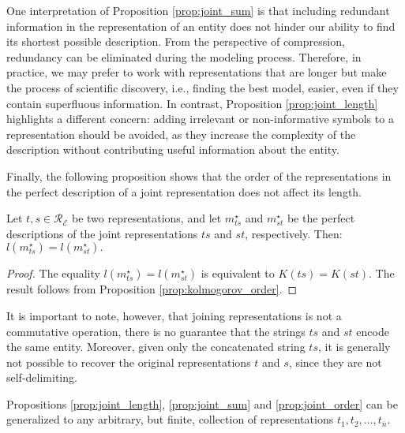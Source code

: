One interpretation of Proposition \ref{prop:joint_sum} is that including redundant information in the representation of an entity does not hinder our ability to find its shortest possible description. From the perspective of compression, redundancy can be eliminated during the modeling process. Therefore, in practice, we may prefer to work with representations that are longer but make the process of scientific discovery, i.e., finding the best model, easier, even if they contain superfluous information. In contrast, Proposition \ref{prop:joint_length} highlights a different concern: adding irrelevant or non-informative symbols to a representation should be avoided, as they increase the complexity of the description without contributing useful information about the entity.

Finally, the following proposition shows that the order of the representations in the perfect description of a joint representation does not affect its length.

\begin{proposition}
\label{prop:joint_order}
Let $t, s \in \mathcal{R}_\mathcal{E}$ be two representations, and let $m_{ts}^{\star}$ and $m_{st}^{\star}$ be the perfect descriptions of the joint representations $ts$ and $st$, respectively. Then: $l \left( m_{ts}^{\star} \right) = l \left( m_{st}^{\star} \right).$
\end{proposition}
\begin{proof}
The equality $l \left( m_{ts}^{\star} \right) = l \left( m_{st}^{\star} \right)$ is equivalent to $K(ts) = K(st)$. The result follows from Proposition \ref{prop:kolmogorov_order}.
\end{proof}

It is important to note, however, that joining representations is not a commutative operation, there is no guarantee that the strings $ts$ and $st$ encode the same entity. Moreover, given only the concatenated string $ts$, it is generally not possible to recover the original representations $t$ and $s$, since they are not self-delimiting.

Propositions \ref{prop:joint_length}, \ref{prop:joint_sum} and \ref{prop:joint_order} can be generalized to any arbitrary, but finite, collection of representations $t_1, t_2, \ldots, t_n$.

